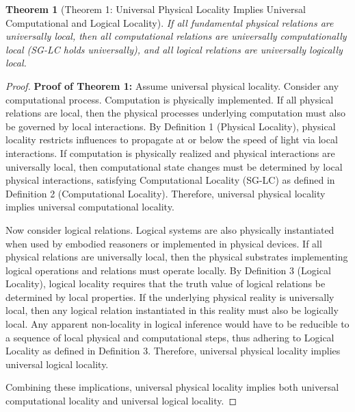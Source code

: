 \documentclass{article}
\newtheorem{theorem}{Theorem}
\begin{document}
	\begin{theorem}[Theorem 1: Universal Physical Locality Implies Universal Computational and Logical Locality]
		If all fundamental physical relations are universally local, then all computational relations are universally computationally local (SG-LC holds universally), and all logical relations are universally logically local.
	\end{theorem}
	\begin{proof}
		\textbf{Proof of Theorem 1:} Assume universal physical locality. Consider any computational process. Computation is physically implemented. If all physical relations are local, then the physical processes underlying computation must also be governed by local interactions. By Definition 1 (Physical Locality), physical locality restricts influences to propagate at or below the speed of light via local interactions. If computation is physically realized and physical interactions are universally local, then computational state changes must be determined by local physical interactions, satisfying Computational Locality (SG-LC) as defined in Definition 2 (Computational Locality). Therefore, universal physical locality implies universal computational locality.
		
		Now consider logical relations. Logical systems are also physically instantiated when used by embodied reasoners or implemented in physical devices. If all physical relations are universally local, then the physical substrates implementing logical operations and relations must operate locally. By Definition 3 (Logical Locality), logical locality requires that the truth value of logical relations be determined by local properties. If the underlying physical reality is universally local, then any logical relation instantiated in this reality must also be logically local. Any apparent non-locality in logical inference would have to be reducible to a sequence of local physical and computational steps, thus adhering to Logical Locality as defined in Definition 3. Therefore, universal physical locality implies universal logical locality.
		
		Combining these implications, universal physical locality implies both universal computational locality and universal logical locality.
	\end{proof}
	
\end{document}
